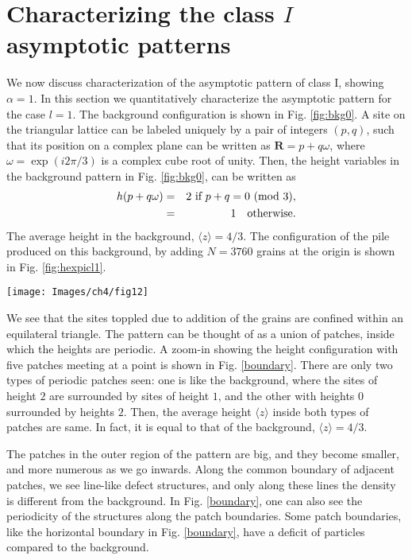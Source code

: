 \documentclass[11pt,a4paper]{book}
\begin{document}
\section{Characterizing the class $I$ asymptotic patterns\label{sec:anc}}
We now discuss characterization of the asymptotic pattern of class I,
showing $\alpha =1$. In this section we quantitatively characterize
the asymptotic pattern for the case $l=1$. The background
configuration is shown in Fig. \ref{fig:bkg0}.  A site on the
triangular lattice can be labeled uniquely by a pair of integers
$\left(p, q\right)$, such that its position on a complex plane can be
written as $\mathbf{R}=p+q \omega$, where $\omega=\exp\left( i2\pi/3 \right)$ is
a complex cube root of unity. Then, the height variables in the
background pattern in Fig. \ref{fig:bkg0}, can be written as
\begin{eqnarray}
h(p+q\omega) &=&2 \textrm{ if } p + q =0 \textrm{ (mod 3),}\nonumber\\
  &=&1 \rm{~ ~ ~otherwise.}
\end{eqnarray}
The average height in the background, $\langle z \rangle=4/3$. The
configuration of the pile  produced on this background, by adding
$N=3760$ grains at the origin is shown in Fig. \ref{fig:hexpicl1}.
%
\begin{SCfigure}
\texttt{[image: Images/ch4/fig12]}
\caption{(color in the electronic copy) An example of patch boundaries in Fig. \ref{fig:hexpicl1}
meeting each other. Each filled hexagon represents Wigner cell around
a site, and the color in them denotes height of that site. The color code is same as in
Fig. \ref{fig:hexpicl1}.}
\label{boundary}
\end{SCfigure}
%

We see that the sites toppled due to addition of the grains are
confined within an equilateral triangle. The pattern can be thought of
as a union of patches, inside which the heights are periodic. A
zoom-in showing the height configuration with five patches meeting at
a point is shown in Fig. \ref{boundary}. There are only two types of
periodic patches seen: one is like the background, where the sites of
height $2$ are surrounded by sites of height $1$, and the other with
heights $0$ surrounded by heights $2$. Then, the average height
$\langle z \rangle$ inside both types of patches are same. In fact,
it is equal to that of the background, $\langle z \rangle=4/3$.

The patches in the outer region of the pattern are big, and they
become smaller, and more numerous as we go inwards. Along the common
boundary of adjacent patches, we see line-like defect structures, and
only along these lines the density is different from the background. In Fig. \ref{boundary}, one
can also see the periodicity of the structures along the patch
boundaries.  Some patch boundaries, like the horizontal boundary in
Fig. \ref{boundary}, have a deficit of particles compared to the background.
\end{document}
